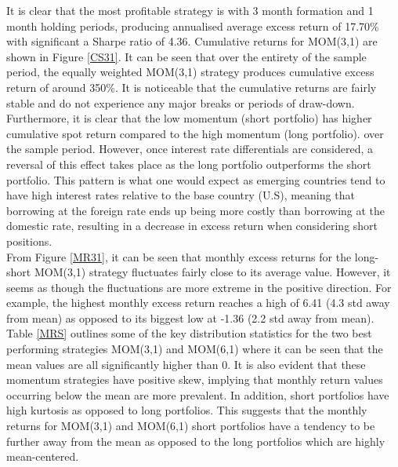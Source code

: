 \documentclass{article}
\begin{document}
It is clear that the most profitable strategy is with 3 month formation and 1 month holding periods, producing annualised average excess return of 17.70\% with significant a Sharpe ratio of 4.36. Cumulative returns for MOM(3,1) are shown in Figure \ref{CS31}. It can be seen that over the entirety of the sample period, the equally weighted MOM(3,1) strategy produces cumulative excess return of around 350\%. It is noticeable that the cumulative returns are fairly stable and do not experience any major breaks or periods of draw-down. Furthermore, it is clear that the low momentum (short portfolio) has higher cumulative spot return compared to the high momentum (long portfolio). over the sample period. However, once interest rate differentials are considered, a reversal of this effect takes place as the long portfolio outperforms the short portfolio. This pattern is what one would expect as emerging countries tend to have high interest rates relative to the base country (U.S), meaning that borrowing at the foreign rate ends up being more costly than borrowing at the domestic rate, resulting in a decrease in excess return when considering short positions.\\

From Figure \ref{MR31}, it can be seen that monthly excess returns for the long-short MOM(3,1) strategy fluctuates fairly close to its average value. However, it seems as though the fluctuations are more extreme in the positive direction. For example, the highest monthly excess return reaches a high of 6.41 (4.3 std away from mean) as opposed to its biggest low at -1.36 (2.2 std away from mean).\\

Table \ref{MRS} outlines some of the key distribution statistics for the two best performing strategies MOM(3,1) and MOM(6,1) where it can be seen that the mean values are all significantly higher than 0. It is also evident that these momentum strategies have positive skew, implying that monthly return values occurring below the mean are more prevalent. In addition, short portfolios have high kurtosis as opposed to long portfolios. This suggests that the monthly returns for MOM(3,1) and MOM(6,1) short portfolios have a tendency to be further away from the mean as opposed to the long portfolios which are highly mean-centered.
\end{document}
